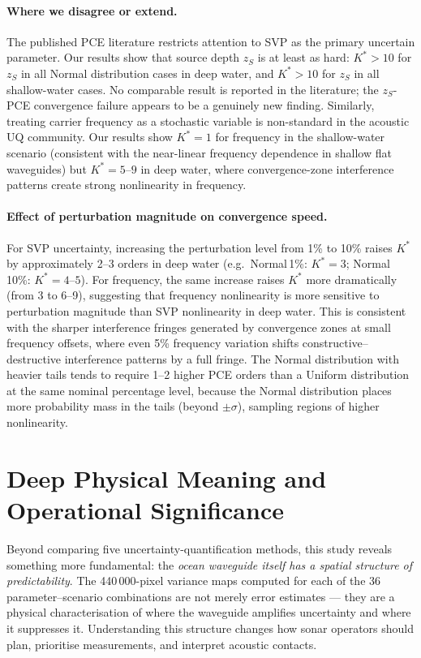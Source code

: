\documentclass[11pt,a4paper]{article}
\begin{document}
\paragraph{Where we disagree or extend.}
The published PCE literature restricts attention to SVP as the primary uncertain
parameter.
Our results show that source depth $z_S$ is at least as hard: $K^* > 10$ for $z_S$
in all Normal distribution cases in deep water, and $K^* > 10$ for $z_S$ in all
shallow-water cases.
No comparable result is reported in the literature; the $z_S$-PCE convergence failure
appears to be a genuinely new finding.
Similarly, treating carrier frequency as a stochastic variable is non-standard in
the acoustic UQ community.
Our results show $K^* = 1$ for frequency in the shallow-water scenario (consistent with
the near-linear frequency dependence in shallow flat waveguides) but $K^* = 5$--$9$
in deep water, where convergence-zone interference patterns create strong nonlinearity
in frequency.

\paragraph{Effect of perturbation magnitude on convergence speed.}
For SVP uncertainty, increasing the perturbation level from 1\% to 10\% raises
$K^*$ by approximately 2--3 orders in deep water (e.g.\ Normal\,1\%: $K^* = 3$;
Normal\,10\%: $K^* = 4$--$5$).
For frequency, the same increase raises $K^*$ more dramatically (from 3 to 6--9),
suggesting that frequency nonlinearity is more sensitive to perturbation magnitude
than SVP nonlinearity in deep water.
This is consistent with the sharper interference fringes generated by convergence
zones at small frequency offsets, where even 5\% frequency variation shifts
constructive--destructive interference patterns by a full fringe.
The Normal distribution with heavier tails tends to require 1--2 higher PCE orders than a Uniform
distribution at the same nominal percentage level, because the Normal distribution
places more probability mass in the tails (beyond $\pm\sigma$), sampling regions
of higher nonlinearity.

\clearpage
\section{Deep Physical Meaning and Operational Significance}
\label{sec:deep_meaning}

Beyond comparing five uncertainty-quantification methods, this study reveals something
more fundamental: the \emph{ocean waveguide itself has a spatial structure of predictability}.
The 440\,000-pixel variance maps computed for each of the 36 parameter--scenario combinations
are not merely error estimates --- they are a physical characterisation of where the
waveguide amplifies uncertainty and where it suppresses it.
Understanding this structure changes how sonar operators should plan, prioritise measurements,
and interpret acoustic contacts.
\end{document}

